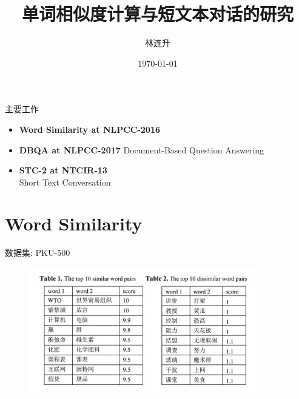 \documentclass[aspectratio=169]{beamer} %
\title{单词相似度计算与短文本对话的研究}
\date{\today}
\author{林连升}
\begin{document}
  \maketitle


  \begin{frame}{主要工作}
    \begin{itemize}
    \item \textbf{Word Similarity at NLPCC-2016} \newline
    \item \textbf{DBQA at NLPCC-2017} \newline
      Document-Based Question Answering
    \item \textbf{STC-2 at NTCIR-13} \\
      Short Text Conversation
    \end{itemize}
    \end{frame}
  \section{Word Similarity}

    \begin{frame}{数据集: PKU-500}
    \begin{center}
      \begin{figure}
      \includegraphics[width=4in,height=2.2in]{pku-500-1.jpg}
      \end{figure}
      \end{center}
    \end{frame}
\end{document}
